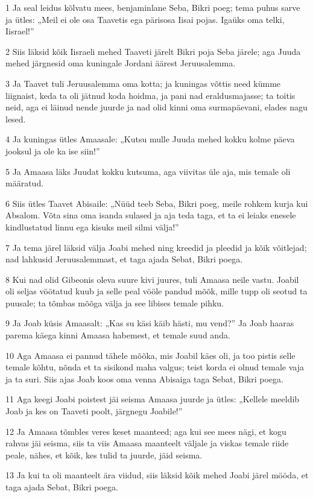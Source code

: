 \par 1 Ja seal leidus kõlvatu mees, benjaminlane Seba, Bikri poeg; tema puhus sarve ja ütles: „Meil ei ole osa Taavetis ega pärisosa Iisai pojas. Igaüks oma telki, Iisrael!”
\par 2 Siis läksid kõik Iisraeli mehed Taaveti järelt Bikri poja Seba järele; aga Juuda mehed järgnesid oma kuningale Jordani äärest Jeruusalemma.
\par 3 Ja Taavet tuli Jeruusalemma oma kotta; ja kuningas võttis need kümme liignaist, keda ta oli jätnud koda hoidma, ja pani nad eraldusmajasse; ta toitis neid, aga ei läinud nende juurde ja nad olid kinni oma surmapäevani, elades nagu lesed.
\par 4 Ja kuningas ütles Amaasale: „Kutsu mulle Juuda mehed kokku kolme päeva jooksul ja ole ka ise siin!”
\par 5 Ja Amaasa läks Juudat kokku kutsuma, aga viivitas üle aja, mis temale oli määratud.
\par 6 Siis ütles Taavet Abisaile: „Nüüd teeb Seba, Bikri poeg, meile rohkem kurja kui Absalom. Võta sina oma isanda sulased ja aja teda taga, et ta ei leiaks enesele kindlustatud linnu ega kisuks meil silmi välja!”
\par 7 Ja tema järel läksid välja Joabi mehed ning kreedid ja pleedid ja kõik võitlejad; nad lahkusid Jeruusalemmast, et taga ajada Sebat, Bikri poega.
\par 8 Kui nad olid Gibeonis oleva suure kivi juures, tuli Amaasa neile vastu. Joabil oli seljas vöötatud kuub ja selle peal vööle pandud mõõk, mille tupp oli seotud ta puusale; ta tõmbas mõõga välja ja see libises temale pihku.
\par 9 Ja Joab küsis Amaasalt: „Kas su käsi käib hästi, mu vend?” Ja Joab haaras parema käega kinni Amaasa habemest, et temale suud anda.
\par 10 Aga Amaasa ei pannud tähele mõõka, mis Joabil käes oli, ja too pistis selle temale kõhtu, nõnda et ta sisikond maha valgus; teist korda ei olnud temale vaja ja ta suri. Siis ajas Joab koos oma venna Abisaiga taga Sebat, Bikri poega.
\par 11 Aga keegi Joabi poistest jäi seisma Amaasa juurde ja ütles: „Kellele meeldib Joab ja kes on Taaveti poolt, järgnegu Joabile!”
\par 12 Ja Amaasa tõmbles veres keset maanteed; aga kui see mees nägi, et kogu rahvas jäi seisma, siis ta viis Amaasa maanteelt väljale ja viskas temale riide peale, nähes, et kõik, kes tulid ta juurde, jäid seisma.
\par 13 Ja kui ta oli maanteelt ära viidud, siis läksid kõik mehed Joabi järel mööda, et taga ajada Sebat, Bikri poega.
